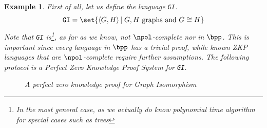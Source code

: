 \documentclass{article}
\newtheorem{example}{Example}
\begin{document}
\begin{example}
    First of all, let us define the language \texttt{GI}.
    \[ \texttt{GI} = \set{ \left<G, H\right> | \; G,H \text{ graphs and } G \cong H }\]
    Note that \texttt{GI} is\footnote{In the most general case, as we actually do know polynomial time algorithm for special cases such as trees}, as far as we know, not $\npol$-complete nor in $\bpp$.
    This is important since every language in $\bpp$ has a trivial proof, while known ZKP languages that are $\npol$-complete require further assumptions.
    The following protocol \cite{goldreichProofsThatYield1991} \cite{goldreichFoundationsCryptographyVol2007} is a Perfect Zero Knowledge Proof System for \texttt{GI}.

    \begin{figure}[H]
        \centering
        \caption{A perfect zero knowledge proof for Graph Isomorphism}
        \label{graphisomorphismzkp}
    \end{figure}


\end{example}
\end{document}
